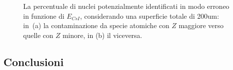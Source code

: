 \begin{figure}[!p] 
	\centering
	\hspace{10mm}
	\caption{La percentuale di nuclei potenzialmente identificati in modo erroneo in funzione di $E_{CsI}$, considerando una superficie totale di 200um: in~(a) la contaminazione da specie atomiche con $Z$ maggiore verso quelle con $Z$ minore, in (b) il viceversa.} \label{fig:leakage_res_200um}
\end{figure}



\subsection*{Conclusioni}

